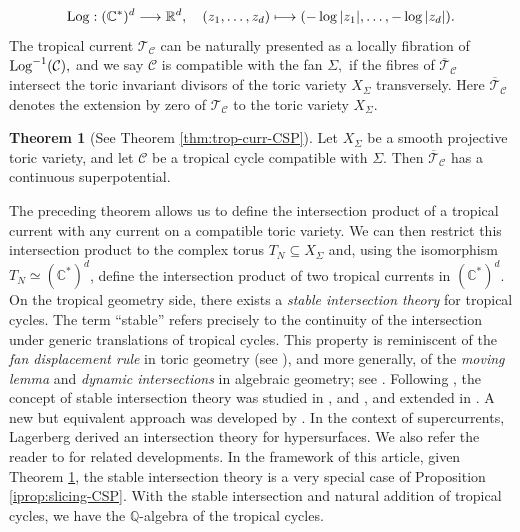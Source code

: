 \documentclass[11pt]{amsart}
\def\Log{{\rm Log}}
\theoremstyle{definition}
\newcommand{\R}{\mathbb{R}}
\newcommand{\lto}{\longrightarrow}
\newcommand{\lmto}{\longmapsto}
\newcommand{\C}{\mathbb{C}}
\newcommand{\cC}{\mathcal{C}}
\newcommand{\sT}{\mathscr{T}}
\newtheorem{itheorem}{Theorem}
\begin{document}
$$
\Log: (\C^*)^d \lto \R^d, \quad (z_1, \dots , z_d) \lmto (-\log|z_1|, \dots , -\log|z_d|).
$$
The tropical current $\sT_{\cC}$ can be naturally presented as a locally fibration of $\Log^{-1}(\cC),$ and we say $\cC$ is compatible with the fan $\Sigma,$ if the fibres of $\overline{\sT}_{\cC}$ intersect the toric invariant divisors of the toric variety $X_{\Sigma}$ transversely. Here $\overline{\sT}_{\cC}$ denotes the extension by zero of $\sT_{\cC}$ to the toric variety $X_{\Sigma}.$

\begin{itheorem}[See Theorem \ref{thm:trop-curr-CSP}]\label{ithm:trop-curr-CSP}
    Let $X_{\Sigma}$ be a smooth projective toric variety, and let $\cC$ be a tropical cycle compatible with $\Sigma.$ Then 
    $\overline{\sT}_{\cC}$ has a continuous superpotential. 
\end{itheorem}
The preceding theorem allows us to define the intersection product of a tropical current with any current on a compatible toric variety. We can then restrict this intersection product to the complex torus \( T_N \subseteq X_{\Sigma} \) and, using the isomorphism \( T_N \simeq (\mathbb{C}^*)^d \), define the intersection product of two tropical currents in \( (\mathbb{C}^*)^d \).
\vskip 2mm
On the tropical geometry side, there exists a \emph{stable intersection theory} for tropical cycles. The term “stable” refers precisely to the continuity of the intersection under generic translations of tropical cycles. This property is reminiscent of the \emph{fan displacement rule} in toric geometry (see \cite{Fulton--Sturmfels}), and more generally, of the \emph{moving lemma} and \emph{dynamic intersections} in algebraic geometry; see \cite{Fulton_int}. Following \cite{Fulton--Sturmfels}, the concept of stable intersection theory was studied in \cite{Kazarnovski}, \cite{RGST} and \cite{Mikh-trop-appli}, and extended in \cite{Jensen-Yu}. A new but equivalent approach was developed by \cite{All-Rau}. In the context of supercurrents, Lagerberg \cite{Lagerberg} derived an intersection theory for hypersurfaces. We also refer the reader to \cite{Shaw-Int-Mat, Gubler, Mihatsch} for related developments.
\vskip 2mm
\noindent
In the framework of this article, given Theorem \ref{ithm:trop-curr-CSP}, the stable intersection theory is a very special case of Proposition \ref{iprop:slicing-CSP}. 
\vskip 2mm
With the stable intersection and natural addition of tropical cycles, we have the $\mathbb{Q}$-algebra of the tropical cycles. 
\end{document}
